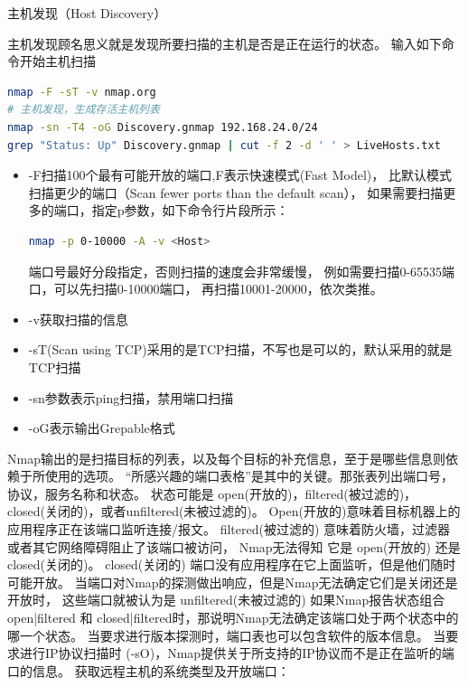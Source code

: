 \documentclass[12pt]{book}
\makeatletter
\numberwithin{dummy}{section}
\theoremstyle{ocrenumbox}
\theoremstyle{blacknumex}
\theoremstyle{blacknumbox}
\theoremstyle{ocrenum}
\renewcommand{\subsection}{\@startsection {subsection}{2}{\z@}
	{-3ex \@plus -0.1ex \@minus -.4ex}
	{0.5ex \@plus.2ex }
	{\normalfont\sffamily\bfseries}}
\makeatother
\begin{document}
\subsection{主机发现（Host Discovery）}

主机发现顾名思义就是发现所要扫描的主机是否是正在运行的状态。
输入如下命令开始主机扫描

\begin{lstlisting}[language=Bash]
nmap -F -sT -v nmap.org
# 主机发现，生成存活主机列表
nmap -sn -T4 -oG Discovery.gnmap 192.168.24.0/24
grep "Status: Up" Discovery.gnmap | cut -f 2 -d ' ' > LiveHosts.txt
\end{lstlisting}

\begin{itemize}
	\item{-F}扫描100个最有可能开放的端口,F表示快速模式(Fast Model)，
	比默认模式扫描更少的端口（Scan fewer ports than the default scan），
	如果需要扫描更多的端口，指定p参数，如下命令行片段所示：
	
\begin{lstlisting}[language=Bash]
nmap -p 0-10000 -A -v <Host>
\end{lstlisting}
	
	端口号最好分段指定，否则扫描的速度会非常缓慢，
	例如需要扫描0-65535端口，可以先扫描0-10000端口，
	再扫描10001-20000，依次类推。
	
	\item{-v}获取扫描的信息
	\item{-sT(Scan using TCP)}采用的是TCP扫描，不写也是可以的，默认采用的就是TCP扫描
	\item{-sn参数表示ping扫描，禁用端口扫描}
	\item{-oG表示输出Grepable格式}
\end{itemize}

Nmap输出的是扫描目标的列表，以及每个目标的补充信息，至于是哪些信息则依赖于所使用的选项。
“所感兴趣的端口表格”是其中的关键。那张表列出端口号，协议，服务名称和状态。
状态可能是 open(开放的)，filtered(被过滤的)， closed(关闭的)，或者unfiltered(未被过滤的)。
Open(开放的)意味着目标机器上的应用程序正在该端口监听连接/报文。 
filtered(被过滤的) 意味着防火墙，过滤器或者其它网络障碍阻止了该端口被访问，
Nmap无法得知 它是 open(开放的) 还是 closed(关闭的)。 
closed(关闭的) 端口没有应用程序在它上面监听，但是他们随时可能开放。 
当端口对Nmap的探测做出响应，但是Nmap无法确定它们是关闭还是开放时，
这些端口就被认为是 unfiltered(未被过滤的) 如果Nmap报告状态组合 
open|filtered 和 closed|filtered时，那说明Nmap无法确定该端口处于两个状态中的哪一个状态。
当要求进行版本探测时，端口表也可以包含软件的版本信息。
当要求进行IP协议扫描时 (-sO)，Nmap提供关于所支持的IP协议而不是正在监听的端口的信息。
获取远程主机的系统类型及开放端口：
\end{document}
